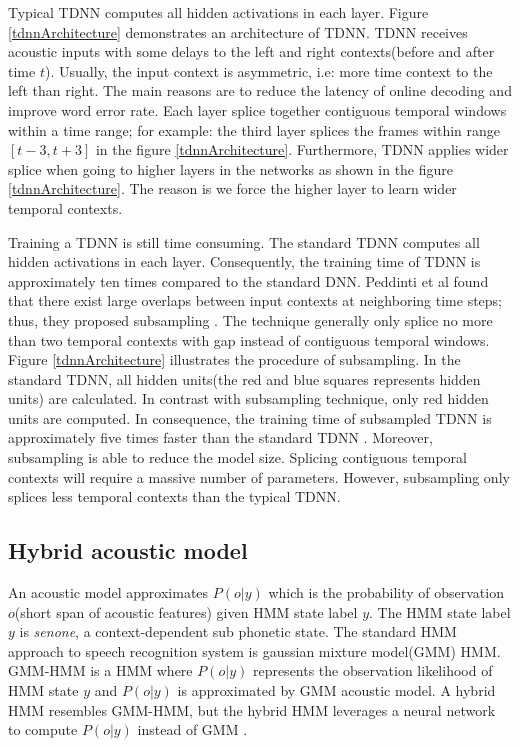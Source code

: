 Typical TDNN computes all hidden activations in each layer. Figure \ref{tdnnArchitecture} demonstrates an architecture of TDNN. TDNN receives acoustic inputs with some delays to the left and right contexts(before and after time $t$). Usually, the input context is asymmetric, i.e: more time context to the left than right. The main reasons are to reduce the latency of online decoding and improve word error rate. Each layer splice together contiguous temporal windows within a time range; for example: the third layer splices the frames within range $[t-3, t+3]$ in the figure  \ref{tdnnArchitecture}. Furthermore, TDNN applies wider splice when going to higher layers in the networks as shown in the figure \ref{tdnnArchitecture}. The reason is we force the higher layer to learn wider temporal contexts.

Training a TDNN is still time consuming. The standard TDNN computes all hidden activations in each layer. Consequently, the training time of TDNN is approximately ten times compared to the standard DNN.  Peddinti et al found that there exist large overlaps between input contexts at neighboring time steps; thus, they proposed subsampling \cite{Peddinti2015ATD}. The technique generally only splice no more than two temporal contexts with gap instead of contiguous temporal windows. Figure \ref{tdnnArchitecture} illustrates the procedure of subsampling. In the standard TDNN, all hidden units(the red and blue squares represents hidden units) are calculated. In contrast with subsampling technique, only red hidden units are computed. In consequence, the training time of subsampled TDNN is approximately five times faster than the standard TDNN \cite{Peddinti2015ATD}. Moreover, subsampling is able to reduce the model size. Splicing contiguous temporal contexts will require a massive number of parameters. However, subsampling only splices less temporal contexts than the typical TDNN.

\subsection{Hybrid acoustic model}
\label{HybridAcousticModel}

An acoustic model approximates $P(o|y)$ which is the probability of  observation $o$(short span of acoustic features) given HMM state label $y$. The HMM state label $y$ is \textit{senone}, a context-dependent sub phonetic state. The standard HMM approach to speech recognition system is gaussian mixture model(GMM) HMM. GMM-HMM is a HMM where $P(o|y)$ represents the observation likelihood of HMM state $y$ and  $P(o|y)$ is approximated by GMM acoustic model. A hybrid HMM resembles GMM-HMM, but the hybrid HMM leverages a neural network to compute $P(o|y)$ instead of GMM \cite{1406.7806}. 

